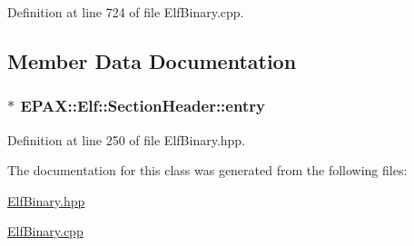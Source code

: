 \-Definition at line 724 of file \-Elf\-Binary.\-cpp.



\subsection{\-Member \-Data \-Documentation}
\hypertarget{class_e_p_a_x_1_1_elf_1_1_section_header_a84d8a573ab3f70298e15d46e83197260}{
\subsubsection[{entry}]{$\ast$ {\bf \-E\-P\-A\-X\-::\-Elf\-::\-Section\-Header\-::entry}}}\label{class_e_p_a_x_1_1_elf_1_1_section_header_a84d8a573ab3f70298e15d46e83197260}


\-Definition at line 250 of file \-Elf\-Binary.\-hpp.



\-The documentation for this class was generated from the following files\-:\begin{DoxyCompactItemize}
\item 
\hyperlink{_elf_binary_8hpp}{\-Elf\-Binary.\-hpp}\item 
\hyperlink{_elf_binary_8cpp}{\-Elf\-Binary.\-cpp}\end{DoxyCompactItemize}
